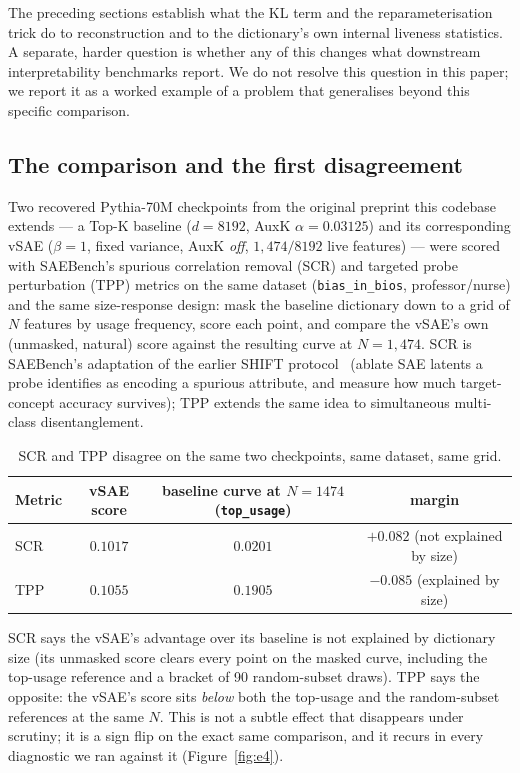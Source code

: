 \documentclass[11pt]{article}
\begin{document}
The preceding sections establish what the KL term and the reparameterisation
trick do to reconstruction and to the dictionary's own internal liveness
statistics. A separate, harder question is whether any of this changes what
downstream interpretability benchmarks report. We do not resolve this
question in this paper; we report it as a worked example of a problem that
generalises beyond this specific comparison.

\subsection{The comparison and the first disagreement}

Two recovered Pythia-70M checkpoints from the original preprint this
codebase extends --- a Top-K baseline ($d=8192$, AuxK $\alpha=0.03125$) and
its corresponding vSAE ($\beta=1$, fixed variance, AuxK \emph{off},
$1{,}474/8192$ live features) --- were scored with SAEBench's spurious
correlation removal (SCR) and targeted probe perturbation (TPP) metrics
\citep{karvonen2025saebenchcomprehensivebenchmarksparse} on the same
dataset (\texttt{bias\_in\_bios}, professor/nurse) and the same
size-response design: mask the baseline dictionary down to a grid of $N$
features by usage frequency, score each point, and compare the vSAE's own
(unmasked, natural) score against the resulting curve at $N=1{,}474$. SCR
is SAEBench's adaptation of the earlier SHIFT
protocol~\citep{marks2025sparsefeaturecircuitsdiscovering} (ablate
SAE latents a probe identifies as encoding a spurious attribute, and
measure how much target-concept accuracy survives); TPP extends the same
idea to simultaneous multi-class disentanglement.

\begin{table}[h]
\centering
\caption{SCR and TPP disagree on the same two checkpoints, same dataset,
same grid.}
\label{tab:e4}
\small
\begin{tabular}{lccc}
\toprule
Metric & vSAE score & baseline curve at $N=1474$ (\texttt{top\_usage}) & margin \\
\midrule
SCR & $0.1017$ & $0.0201$ & $+0.082$ (not explained by size) \\
TPP & $0.1055$ & $0.1905$ & $-0.085$ (explained by size) \\
\bottomrule
\end{tabular}
\end{table}

SCR says the vSAE's advantage over its baseline is not explained by
dictionary size (its unmasked score clears every point on the masked curve,
including the top-usage reference and a bracket of 90 random-subset draws).
TPP says the opposite: the vSAE's score sits \emph{below} both the top-usage
and the random-subset references at the same $N$. This is not a subtle
effect that disappears under scrutiny; it is a sign flip on the exact same
comparison, and it recurs in every diagnostic we ran against it
(Figure~\ref{fig:e4}).
\end{document}
